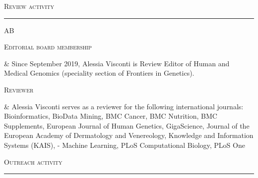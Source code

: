 \documentclass[a4paper,10pt]{article}
\newcommand{\mediumtitle}[1]{
	\vspace{0.2cm}
	{\noindent
	\Large \textsc{#1}\\[-2ex]
	\hrule
	\vspace{0.2cm}}
}
\newenvironment{doubletablelist}
{
	\vspace{-0.2cm}
	\begin{longtable}[!h]{AB}}{\end{longtable}
}
\newcommand{\dtlist}[2]{
\hspace{-3cm}
\noindent
	\begin{minipage}{0.22\textwidth}
	\begin{flushright}
	\textsc{#1}
	\end{flushright}
	\end{minipage}
	& #2\\[0.2cm]
}
\begin{document}
\mediumtitle{Review activity}
\begin{doubletablelist}
\dtlist{Editorial board membership}{ Since September 2019, Alessia Visconti is Review Editor of Human and Medical Genomics (speciality section of Frontiers in Genetics).}
\dtlist{Reviewer}{ Alessia Visconti serves as a reviewer for the following international journals: Bioinformatics, BioData Mining, BMC Cancer, BMC Nutrition, BMC Supplements, European Journal of Human Genetics, GigaScience, Journal of the European Academy of Dermatology and Venereology, Knowledge and Information Systems (KAIS), - Machine Learning, PLoS Computational Biology, PLoS One
}
\end{doubletablelist}
%


\mediumtitle{Outreach activity}
\end{document}
